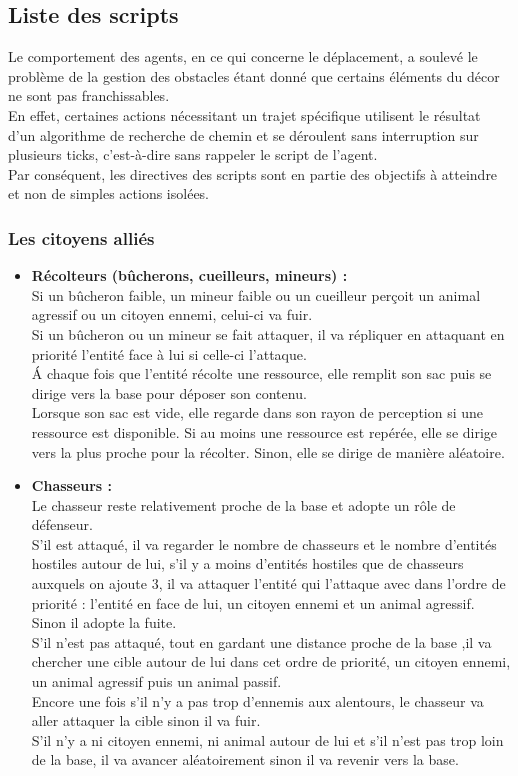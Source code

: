 \documentclass[a4paper]{memoir}
\begin{document}
			\subsection{Liste des scripts}
				Le comportement des agents, en ce qui concerne le déplacement, a soulevé le problème de la gestion des obstacles étant donné que certains éléments du décor ne sont pas franchissables.\\
				En effet, certaines actions nécessitant un trajet spécifique utilisent le résultat d'un algorithme de recherche de chemin et se déroulent sans interruption sur plusieurs ticks, c'est-à-dire sans rappeler le script de l'agent.\\
				Par conséquent, les directives des scripts sont en partie des objectifs à atteindre et non de simples actions isolées.
	
				\subsubsection{Les citoyens alliés}
					\begin{itemize}[label=$\bullet$]
						\item \textbf{Récolteurs (bûcherons, cueilleurs, mineurs) :} \\ Si un bûcheron faible, un mineur faible ou un cueilleur perçoit un animal agressif ou un citoyen ennemi, celui-ci va fuir.\\
							Si un bûcheron ou un mineur se fait attaquer, il va répliquer en attaquant en priorité l'entité face à lui si celle-ci l'attaque.\\
							\'A chaque fois que l'entité récolte une ressource, elle remplit son sac puis se dirige vers la base pour déposer son contenu.\\
							Lorsque son sac est vide, elle regarde dans son rayon de perception si une ressource est disponible. Si au moins une ressource est repérée, elle se dirige vers la plus proche pour la récolter. Sinon, elle se dirige de manière aléatoire.
						\item \textbf{Chasseurs :} \\ Le chasseur reste relativement proche de la base et adopte un rôle de défenseur.\\
							S'il est attaqué, il va regarder le nombre de chasseurs et le nombre d'entités hostiles autour de lui, s'il y a moins d'entités hostiles que de chasseurs auxquels on ajoute 3, il va attaquer l'entité qui l'attaque avec dans l'ordre de priorité : l'entité en face de lui, un citoyen ennemi et un animal agressif. Sinon il adopte la fuite.\\
							S'il n'est pas attaqué, tout en gardant une distance proche de la base ,il va chercher une cible autour de lui dans cet ordre de priorité, un citoyen ennemi, un animal agressif puis un animal passif.\\
							Encore une fois s'il n'y a pas trop d'ennemis aux alentours, le chasseur va aller attaquer la cible sinon il va fuir.\\
							S'il n'y a ni citoyen ennemi, ni animal autour de lui et s'il n'est pas trop loin de la base, il va avancer aléatoirement sinon il va revenir vers la base.
					\end{itemize}
		
\end{document}
